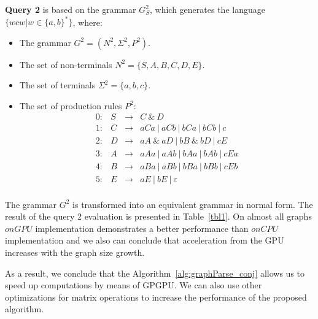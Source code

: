 \textbf{Query 2} is based on the grammar $G^2_S$, which generates the language $\{wcw | w \in \{a,b\}^*\}$, where:
\begin{itemize}
    \item The grammar $G^2 = (N^2, \Sigma^2, P^2)$.
    \item The set of non-terminals $N^2 = \{S, A, B, C, D, E\}$.
    \item The set of terminals $\Sigma^2 = \{a, b, c\}.$
    \item The set of production rules $P^2$:
    \[
    \begin{array}{rccl}
    0: & S & \rightarrow & C ~\& ~ D \\ 
    1: & C & \rightarrow & aCa~|~aCb~|~bCa~|~bCb~|~c\\ 
    2: & D & \rightarrow & aA ~\& ~aD~|~bB ~\& ~bD~|~cE \\ 
    3: & A & \rightarrow & aAa~|~aAb~|~bAa~|~bAb~|~cEa\\ 
    4: & B & \rightarrow & aBa~|~aBb~|~bBa~|~bBb~|~cEb \\
    5: & E & \rightarrow & aE~|~bE~|~\varepsilon \\ 
    \end{array}
    \]

\end{itemize}

The grammar $G^2$ is transformed into an equivalent grammar in normal form. The result of the query 2 evaluation is presented in Table~\ref{tbl1}. On almost all graphs $onGPU$ implementation demonstrates a better performance than $onCPU$ implementation and we also can conclude that acceleration from the GPU increases with the graph size growth.

As a result, we conclude that the Algorithm~\ref{alg:graphParse_conj} allows us to speed up computations by means of GPGPU. We can also use other optimizations for matrix operations to increase the performance of the proposed algorithm.
